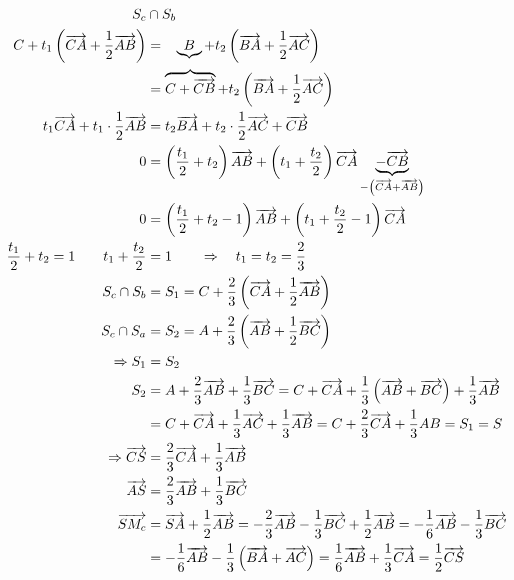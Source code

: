 \begin{mysatz}
\begin{minipage}{0.4\textwidth}
\begin{center}
        \end{center}
    \end{minipage}
    \begin{align*}
        S_c & \cap S_b\\
        C + t_1 \left( \ora{CA} + \frac{1}{2} \ora{AB} \right) & = \ \ \, \underbrace{B} + t_2 \left( \ora{BA} + \frac{1}{2} \ora{AC} \right)\\
        & = \overbrace{C + \ora{CB}} + t_2 \left( \ora{BA} + \frac{1}{2} \ora{AC} \right)\\
        t_1 \ora{CA} + t_1 \cdot \frac{1}{2} \ora{AB} & = t_2 \ora{BA} + t_2 \cdot \frac{1}{2} \ora{AC} + \ora{CB}\\
        0 & = \left( \frac{t_1}{2} + t_2 \right) \ora{AB} + \left( t_1 + \frac{t_2}{2} \right) \ora{CA} \underbrace{- \ora{CB}}_{-\left( \ora{CA} + \ora{AB} \right)}\\
        0 & = \left( \frac{t_1}{2} + t_2 - 1 \right) \ora{AB} + \left( t_1 + \frac{t_2}{2} - 1 \right) \ora{CA}\\
        \frac{t_1}{2} + t_2 = 1 \qquad t_1 + \frac{t_2}{2} & = 1 \qquad \Rightarrow \quad t_1 = t_2 = \frac{2}{3}\\
        S_c \cap S_b & = S_1 = C + \frac{2}{3} \left( \ora{CA} + \frac{1}{2} \ora{AB} \right)\\
        S_c \cap S_a & = S_2 = A + \frac{2}{3} \left( \ora{AB} + \frac{1}{2} \ora{BC} \right)\\
        \Rightarrow S_1 & = S_2\\
        S_2 & = A + \frac{2}{3} \ora{AB} + \frac{1}{3} \ora{BC} = C + \ora{CA} + \frac{1}{3} \left( \ora{AB} + \ora{BC} \right) + \frac{1}{3} \ora{AB}\\
        & = C + \ora{CA} + \frac{1}{3} \ora{AC} + \frac{1}{3} \ora{AB} = C + \frac{2}{3} \ora{CA} + \frac{1}{3} AB = S_1 = S\\
        \Rightarrow \ora{CS} & = \frac{2}{3} \ora{CA} + \frac{1}{3} \ora{AB}\\
        \ora{AS} & = \frac{2}{3} \ora{AB} + \frac{1}{3} \ora{BC}\\
        \ora{SM_c} & = \ora{SA} + \frac{1}{2} \ora{AB} = - \frac{2}{3} \ora{AB} - \frac{1}{3} \ora{BC} + \frac{1}{2} \ora{AB} = - \frac{1}{6} \ora{AB} - \frac{1}{3} \ora{BC}\\
        & = - \frac{1}{6} \ora{AB} - \frac{1}{3} \left( \ora{BA} + \ora{AC} \right) = \frac{1}{6} \ora{AB} + \frac{1}{3} \ora{CA} = \frac{1}{2} \ora{CS}
    \end{align*}
\end{mysatz}

